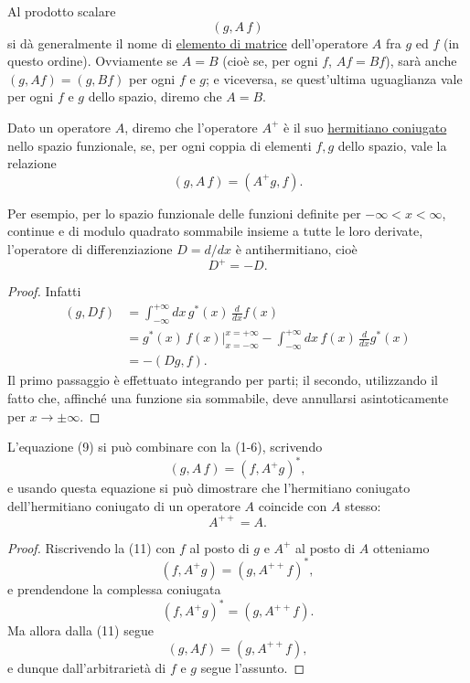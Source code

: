 \documentclass[11pt, a4paper]{book}
\numberwithin{equation}{section}
\begin{document}
Al prodotto scalare
\[
(g, A\,f)
\]
si dà generalmente il nome di \uline{elemento di matrice}
dell'operatore $A$ fra $g$ ed $f$ (in questo ordine). Ovviamente se
$A=B$ (cioè se, per ogni $f$, $Af=Bf$), sarà anche $(g,Af)=(g,Bf)$
per ogni $f$ e $g$; e viceversa, se quest'ultima uguaglianza vale per
ogni $f$ e $g$ dello spazio, diremo che $A=B$.

Dato un operatore $A$, diremo che l'operatore $A^+$ è il suo
\uline{hermitiano coniugato} nello spazio funzionale, se, per ogni
coppia di elementi $f,g$ dello spazio, vale la relazione
\begin{equation}
(g, A\,f) = (A^+g, f).
\end{equation}

Per esempio, per lo spazio funzionale delle funzioni definite per
$-\infty < x < \infty$, continue e di modulo quadrato sommabile insieme
a tutte le loro derivate, l'operatore di differenziazione $D = d/dx$ è
antihermitiano, cioè
\begin{equation}
D^+ = -D.
\end{equation}

\begin{proof}
Infatti
\begin{align*}
(g, Df) &= \int_{-\infty}^{+\infty} dx\, g^*(x)\,\frac{d}{dx}f(x) \\
  &= g^*(x)\,f(x)\Big|_{x=-\infty}^{x=+\infty}
     - \int_{-\infty}^{+\infty} dx\, f(x)\,\frac{d}{dx}g^*(x) \\
  &= -(Dg, f).
\end{align*}
Il primo passaggio è effettuato integrando per parti; il secondo,
utilizzando il fatto che, affinché una funzione sia sommabile, deve
annullarsi asintoticamente per $x \to \pm\infty$.
\end{proof}


L'equazione (9) si può combinare con la (1-6), scrivendo
\begin{equation}
(g, A\,f) = (f, A^+g)^*,
\end{equation}
e usando questa equazione si può dimostrare che l'hermitiano coniugato
dell'hermitiano coniugato di un operatore $A$ coincide con $A$ stesso:
\begin{equation}
A^{++} = A.
\end{equation}

\begin{proof}
Riscrivendo la (11) con $f$ al posto di $g$ e $A^+$ al posto di $A$
otteniamo
\[
(f, A^+g) = (g, A^{++}f)^*,
\]
e prendendone la complessa coniugata
\[
(f, A^+g)^* = (g, A^{++}f).
\]
Ma allora dalla (11) segue
\[
(g, Af) = (g, A^{++}f),
\]
e dunque dall'arbitrarietà di $f$ e $g$ segue l'assunto.
\end{proof}
\end{document}
